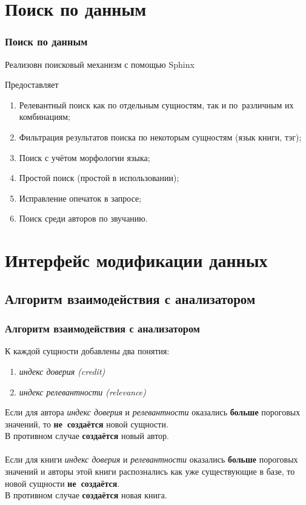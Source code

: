 \documentclass[utf8,handout]{beamer}
\begin{document}
\section{Поиск по данным}
	\begin{frame}
 		\frametitle{Поиск по данным}
 		Реализовн поисковый механизм с помощью Sphinx
 		\begin{block}{}
			Предоставляет
			\begin{enumerate}
				\item  Релевантный поиск как по отдельным сущностям, так и по~различным их комбинациям;
				\item  Фильтрация результатов поиска по некоторым сущностям (язык книги, тэг);
				\item  Поиск с учётом морфологии языка;
				\item  Простой поиск (простой в использовании);
				\item  Исправление опечаток в запросе;
				\item  Поиск среди авторов по звучанию.
			\end{enumerate}
		\end{block}
	\end{frame}
	

\section{Интерфейс модификации данных}
	\subsection{Алгоритм взаимодействия с анализатором}
	\begin{frame}
 		\frametitle{Алгоритм взаимодействия с анализатором}
 		\begin{block}{}
	 		К каждой сущности добавлены два понятия:
 			\begin{enumerate}
 				\item {\em индекс доверия (credit)}
 				\item {\em индекс релевантности (relevance)}
 			\end{enumerate}
 		\end{block}
 		\begin{block}{}
			Если для автора {\em индекс доверия} и {\em релевантности} оказались \textbf{больше} пороговых значений, то
			\textbf{не~создаётся} новой сущности.\\
			В противном случае \textbf{создаётся} новый автор.\\
			~ \\
			Если для книги {\em индекс доверия} и {\em релевантности} оказались \textbf{больше} пороговых значений и
			авторы этой книги распознались как уже существующие в базе, то новой сущности \textbf{не~создаётся}.\\
			В противном случае \textbf{создаётся} новая книга.
		\end{block}
 	\end{frame}
\end{document}
